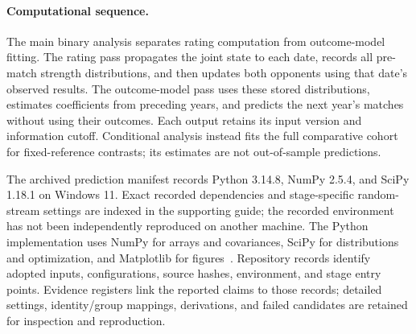 \paragraph{Computational sequence.}
The main binary analysis separates rating computation from outcome-model fitting. The rating pass propagates the joint state to each date, records all pre-match strength distributions, and then updates both opponents using that date's observed results. The outcome-model pass uses these stored distributions, estimates coefficients from preceding years, and predicts the next year's matches without using their outcomes. Each output retains its input version and information cutoff. Conditional analysis instead fits the full comparative cohort for fixed-reference contrasts; its estimates are not out-of-sample predictions.

The archived prediction manifest records Python 3.14.8, NumPy 2.5.4, and SciPy 1.18.1 on Windows 11. Exact recorded dependencies and stage-specific random-stream settings are indexed in the supporting guide; the recorded environment has not been independently reproduced on another machine. The Python implementation uses NumPy for arrays and covariances, SciPy for distributions and optimization, and Matplotlib for figures~\cite{numpy2020,scipy2020,matplotlib2007}. Repository records identify adopted inputs, configurations, source hashes, environment, and stage entry points. Evidence registers link the reported claims to those records; detailed settings, identity/group mappings, derivations, and failed candidates are retained for inspection and reproduction.
